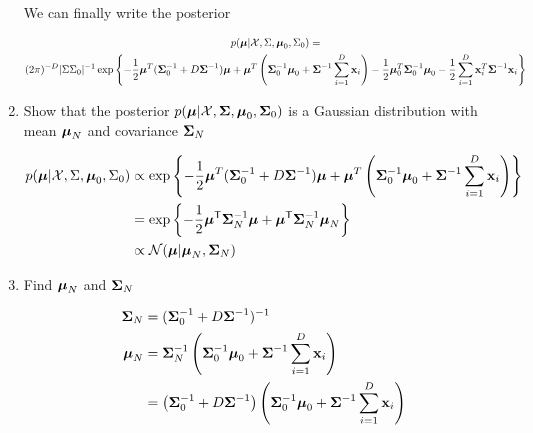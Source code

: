 \documentclass{amsmlaj}
\begin{document}
\begin{problem}
\begin{enumerate}
	We can finally write the posterior

	\begin{multline} \label{}
		p(\bm{\mathbf{\mu}}|\mathcal{X},\Sigma,\bm{\mathbf{\mu}}_0,\Sigma_0) = \\
		(2\pi)^{-D}|\Sigma\Sigma_0|^{-1}\exp\left\{
			-\frac{1}{2}\bm{\mathbf{\mu}}^T(\bm{\mathbf{\Sigma}}_0^{-1}+D\bm{\mathbf{\Sigma}}^{-1})\bm{\mathbf{\mu}}
				+\bm{\mathbf{\mu}}^T\left(
				\bm{\mathbf{\Sigma}}_0^{-1}\bm{\mathbf{\mu}}_0+\bm{\mathbf{\Sigma}}^{-1}\sum_{i=1}^D\bm{\mathbf{x}}_i
			\right)
			-\frac{1}{2}\bm{\mathbf{\mu}}_0^T\bm{\mathbf{\Sigma}}_0^{-1}\bm{\mathbf{\mu}}_0
			-\frac{1}{2}\sum_{i=1}^D\bm{\mathbf{x}}_i^T\bm{\mathbf{\Sigma}}^{-1}\bm{\mathbf{x}}_i
		\right\}
	\end{multline}

\item Show that the posterior
				$p(\bm{\mathbf{\mu}}|\mathcal{X},\bm{\mathbf{\Sigma}},\bm{\mathbf{\mu}}_0,\bm{\mathbf{\Sigma}}_0)$
				is a Gaussian distribution with mean $\bm{\mathbf{\mu}}_N$ and
				covariance $\bm{\mathbf{\Sigma}}_N$

	\begin{align} \label{}
		p(\bm{\mathbf{\mu}}|\mathcal{X},\Sigma,\bm{\mathbf{\mu}}_0,\Sigma_0) &\propto
		\exp\left\{
			-\frac{1}{2}\bm{\mathbf{\mu}}^T(\bm{\mathbf{\Sigma}}_0^{-1}+D\bm{\mathbf{\Sigma}}^{-1})\bm{\mathbf{\mu}}
			+\bm{\mathbf{\mu}}^T\left(
				\bm{\mathbf{\Sigma}}_0^{-1}\bm{\mathbf{\mu}}_0+\bm{\mathbf{\Sigma}}^{-1}\sum_{i=1}^D\bm{\mathbf{x}}_i
			\right)
		\right\} \\
		&=\exp\left\{
			-\frac{1}{2}\bm{\mathbf{\mu}}^{\mathsf{T}}\bm{\mathbf{\Sigma}}_N^{-1}\bm{\mathbf{\mu}}
			+\bm{\mathbf{\mu}}^{\mathsf{T}}\bm{\mathbf{\Sigma}}_N^{-1}\bm{\mathbf{\mu}}_N
		\right\} \\
		& \propto \mathcal{N}(\bm{\mathbf{\mu}}|\bm{\mathbf{\mu}}_N,\bm{\mathbf{\Sigma}}_N)
	\end{align}

\item Find $\bm{\mathbf{\mu}}_N$ and $\bm{\mathbf{\Sigma}}_N$

	\begin{equation}
		\begin{split}
			\bm{\mathbf{\Sigma}}_N&=(\bm{\mathbf{\Sigma}}_0^{-1}+D\bm{\mathbf{\Sigma}}^{-1})^{-1} \\
			\bm{\mathbf{\mu}}_N&=\bm{\mathbf{\Sigma}}_N^{-1} \left(
				\bm{\mathbf{\Sigma}}_0^{-1}\bm{\mathbf{\mu}}_0+\bm{\mathbf{\Sigma}}^{-1}\sum_{i=1}^D\bm{\mathbf{x}}_i
			\right) \\
			&=\left(
				\bm{\mathbf{\Sigma}}_0^{-1}+D\bm{\mathbf{\Sigma}}^{-1}
			\right)\left(
			\bm{\mathbf{\Sigma}}_0^{-1}\bm{\mathbf{\mu}}_0+\bm{\mathbf{\Sigma}}^{-1}\sum_{i=1}^D\bm{\mathbf{x}}_i
			\right)
		\end{split}
	\end{equation}

\end{enumerate}
\end{problem}
\end{document}
